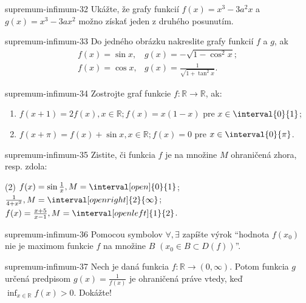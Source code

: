 \begin{defproblem}{supremum-infimum-32}
Ukážte, že grafy funkcií $f(x)=x^3-3a^2x$ a $g(x)=x^3-3ax^2$ možno získať jeden z druhého posunutím.
\end{defproblem}

\begin{defproblem}{supremum-infimum-33}
Do jedného obrázku nakreslite grafy funkcií $f$ a $g$, ak
\begin{align*}
f(x)=\sin x,& g(x)=-\sqrt{1-\cos^2 x};\\
f(x)=\cos x,& g(x)=\frac{1}{\sqrt{1+\tan^2 x}}.
\end{align*}
\end{defproblem}

\begin{defproblem}{supremum-infimum-34}
Zostrojte graf funkcie $f:\mathbb{R} \rightarrow \mathbb{R}$, ak:
\begin{enumerate}
  \item
    $f(x+1) = 2f(x), x \in \mathbb{R};
      f(x) = x(1-x)$ pre $x \in \interval{0}{1}
    $;
  \item
    $f(x+\pi)=f(x)+\sin{x}, x \in \mathbb{R};
      f(x) = 0$ pre $x \in \interval{0}{\pi}
    $.
\end{enumerate}
\end{defproblem}

\begin{defproblem}{supremum-infimum-35}
Zistite, či funkcia $f$ je na množine $M$ ohraničená zhora, resp. zdola:
\begin{tasks}(2)
  \task $f(x)=\sin\frac{1}{x},M=\interval[open]{0}{1}$;
  \task $\frac{1}{4+x^2},M=\interval[open right]{2}{\infty}$;
  \task $f(x)=\frac{x+5}{x-1},M=\interval[open left]{1}{2}$.
\end{tasks}
\end{defproblem}

\begin{defproblem}{supremum-infimum-36}
Pomocou symbolov $\forall,\exists$ zapíšte výrok \enquote{hodnota $f(x_0)$ nie je
maximom funkcie $f$ na množine $B$ $(x_0\in B\subset D(f))$}.
\end{defproblem}

\begin{defproblem}{supremum-infimum-37}
Nech je daná funkcia $f:\mathbb{R}\rightarrow(0,\infty)$. Potom funkcia $g$
určená predpisom $g(x)=\frac{1}{f(x)}$ je ohraničená práve vtedy, keď
$\inf_{x\in\mathbb{R}}f(x)>0$. Dokážte!
\end{defproblem}

